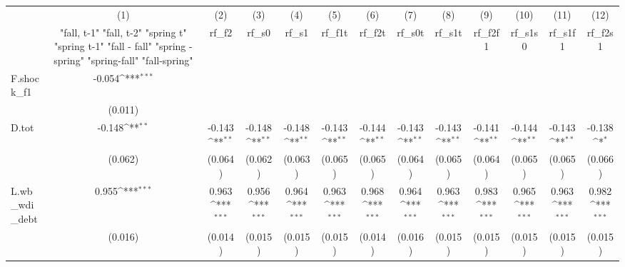 {
\def\sym#1{\ifmmode^{#1}\else\(^{#1}\)\fi}
\begin{tabular}{l*{12}{c}}
\toprule
            &\multicolumn{1}{c}{(1)}&\multicolumn{1}{c}{(2)}&\multicolumn{1}{c}{(3)}&\multicolumn{1}{c}{(4)}&\multicolumn{1}{c}{(5)}&\multicolumn{1}{c}{(6)}&\multicolumn{1}{c}{(7)}&\multicolumn{1}{c}{(8)}&\multicolumn{1}{c}{(9)}&\multicolumn{1}{c}{(10)}&\multicolumn{1}{c}{(11)}&\multicolumn{1}{c}{(12)}\\
            &\multicolumn{1}{c}{  "fall, t-1" "fall, t-2" "spring t" "spring t-1"  "fall - fall" "spring - spring" "spring-fall" "fall-spring" }&\multicolumn{1}{c}{rf\_f2}&\multicolumn{1}{c}{rf\_s0}&\multicolumn{1}{c}{rf\_s1}&\multicolumn{1}{c}{rf\_f1t}&\multicolumn{1}{c}{rf\_f2t}&\multicolumn{1}{c}{rf\_s0t}&\multicolumn{1}{c}{rf\_s1t}&\multicolumn{1}{c}{rf\_f2f1}&\multicolumn{1}{c}{rf\_s1s0}&\multicolumn{1}{c}{rf\_s1f1}&\multicolumn{1}{c}{rf\_f2s1}\\
\midrule
F.shock\_f1  &      -0.054\sym{***}&                     &                     &                     &                     &                     &                     &                     &                     &                     &                     &                     \\
            &     (0.011)         &                     &                     &                     &                     &                     &                     &                     &                     &                     &                     &                     \\
\addlinespace
D.tot       &      -0.148\sym{**} &      -0.143\sym{**} &      -0.148\sym{**} &      -0.148\sym{**} &      -0.143\sym{**} &      -0.144\sym{**} &      -0.143\sym{**} &      -0.143\sym{**} &      -0.141\sym{**} &      -0.144\sym{**} &      -0.143\sym{**} &      -0.138\sym{*}  \\
            &     (0.062)         &     (0.064)         &     (0.062)         &     (0.063)         &     (0.065)         &     (0.065)         &     (0.064)         &     (0.065)         &     (0.064)         &     (0.065)         &     (0.065)         &     (0.066)         \\
\addlinespace
L.wb\_wdi\_debt&       0.955\sym{***}&       0.963\sym{***}&       0.956\sym{***}&       0.964\sym{***}&       0.963\sym{***}&       0.968\sym{***}&       0.964\sym{***}&       0.963\sym{***}&       0.983\sym{***}&       0.965\sym{***}&       0.963\sym{***}&       0.982\sym{***}\\
            &     (0.016)         &     (0.014)         &     (0.015)         &     (0.015)         &     (0.015)         &     (0.014)         &     (0.016)         &     (0.015)         &     (0.015)         &     (0.015)         &     (0.015)         &     (0.015)         \\

\end{tabular}}
